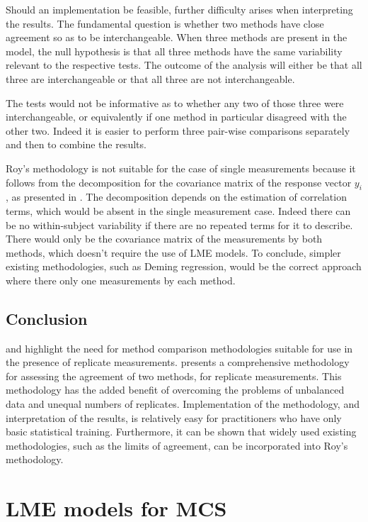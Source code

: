 \documentclass[12pt, a4paper]{report}
\theoremstyle{plain}
\theoremstyle{definition}
\theoremstyle{remark}
\begin{document}
Should an implementation be feasible, further difficulty arises when interpreting the results. The fundamental question is whether two methods have close agreement so as to be interchangeable. When three methods are present in the model, the null hypothesis is that all three methods have the same variability relevant to the respective tests. The outcome of the analysis will either be that all three are interchangeable or that all three are not interchangeable.

The tests would not be informative as to whether any two of those three were interchangeable, or equivalently if one method in particular disagreed with the other two. Indeed it is easier to perform three pair-wise comparisons separately and then to combine the results.

Roy's methodology is not suitable for the case of single measurements because it follows from the decomposition for the covariance matrix of the response vector $y_{i}$, as presented in \citet{hamlett}. The decomposition depends on the estimation of correlation terms, which would be absent in the single measurement case. Indeed there can be no within-subject variability if there are no repeated terms for it to describe. There would only be the covariance matrix of the measurements by both methods, which doesn't require the use of LME models. To conclude, simpler existing methodologies, such as Deming regression, would be the correct approach where there only one measurements by each method.

\section{Conclusion}
\citet{BXC2008} and \citet{ARoy2009} highlight the need for method comparison methodologies suitable for use in the presence of replicate measurements. \citet{ARoy2009} presents a comprehensive methodology for assessing the agreement of two methods, for replicate measurements. This methodology has the added benefit of overcoming the problems of unbalanced data and unequal numbers of replicates. Implementation of the methodology, and interpretation of the results, is relatively easy for practitioners who have only basic statistical training. Furthermore, it can be shown that widely used existing methodologies, such as the limits of agreement, can be incorporated into Roy's methodology.





\chapter{LME models for MCS}
\end{document}
